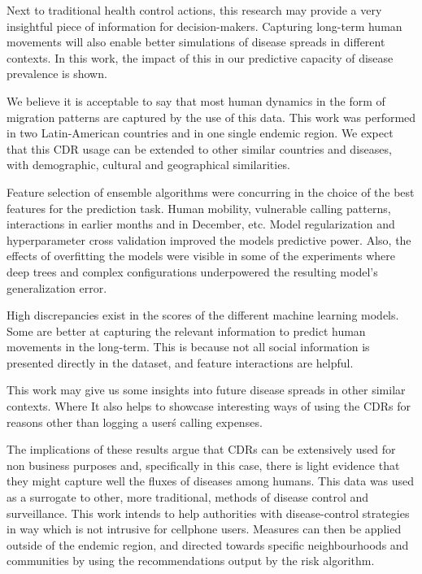 Next to traditional health control actions, this research may provide a very insightful piece of information for decision-makers.
Capturing long-term human movements will also enable better simulations of disease spreads in different contexts.
In this work, the impact of this in our predictive capacity of disease prevalence is shown.



We believe it is acceptable to say that most human dynamics in the form of migration patterns are captured by the use of this data.
This work was performed in two Latin-American countries and in one single endemic region.
We expect that this CDR usage can be extended to other similar countries and diseases, with demographic, cultural and geographical similarities.


Feature selection of ensemble algorithms were concurring in the choice of the best features for the prediction task.
Human mobility, vulnerable calling patterns, interactions in earlier months and in December, etc.
Model regularization and hyperparameter cross validation improved the models predictive power.
Also, the effects of overfitting the models were visible in some of the experiments where deep trees and complex configurations underpowered the resulting model's generalization error.



High discrepancies exist in the scores of the different machine learning models.
Some are better at capturing the relevant information to predict human movements in the long-term.
This is because not all social information is presented directly in the dataset, and feature interactions are helpful.


This work may give us some insights into future disease spreads in other similar contexts.
Where
It also helps to showcase interesting ways of using the CDRs for reasons other than logging a user\'s calling expenses.



The implications of these results argue that CDRs can be extensively used for non business purposes and, specifically in this case, there is light evidence that they might capture well the fluxes of diseases among humans.
This data was used as a surrogate to other, more traditional, methods of disease control and surveillance.
This work intends to help authorities with disease-control strategies in way which is not intrusive for cellphone users.
Measures can then be applied outside of the endemic region, and directed towards specific neighbourhoods and communities by using the recommendations output by the risk algorithm.


